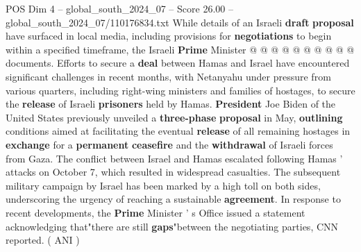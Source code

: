 \begin{textsample}{POS Dim 4 – global\_south\_2024\_07 – Score 26.00 – global\_south\_2024\_07/110176834.txt}
While details of an Israeli \textbf{draft} \textbf{proposal} have surfaced in local media, including provisions for \textbf{negotiations} to begin within a specified timeframe, the Israeli \textbf{Prime} Minister @ @ @ @ @ @ @ @ @ @ documents.
Efforts to secure a \textbf{deal} between Hamas and Israel have encountered significant challenges in recent months, with Netanyahu under pressure from various quarters, including right-wing ministers and families of hostages, to secure the \textbf{release} of Israeli \textbf{prisoners} held by Hamas. \textbf{President} Joe Biden of the United States previously unveiled a \textbf{three-phase} \textbf{proposal} in May, \textbf{outlining} conditions aimed at facilitating the eventual \textbf{release} of all remaining hostages in \textbf{exchange} for a \textbf{permanent} \textbf{ceasefire} and the \textbf{withdrawal} of Israeli forces from Gaza.
The conflict between Israel and Hamas escalated following Hamas ' attacks on October 7, which resulted in widespread casualties.
The subsequent military campaign by Israel has been marked by a high toll on both sides, underscoring the urgency of reaching a sustainable \textbf{agreement}.
In response to recent developments, the \textbf{Prime} Minister ' s Office issued a statement acknowledging that"there are still \textbf{gaps}"between the negotiating parties, CNN reported. ( ANI )

\end{textsample}
